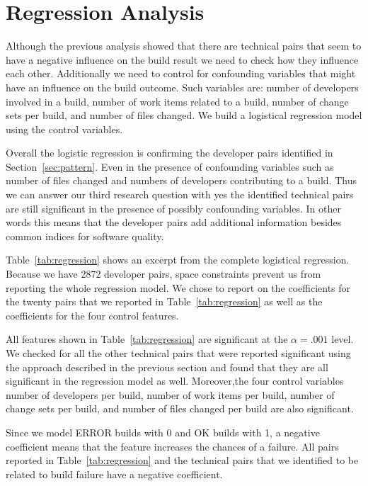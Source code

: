 

\section{Regression Analysis}
\label{sec:regression}
Although the previous analysis showed that there are technical pairs that seem to have a negative influence on the build result we need to check how they influence each other.
Additionally we need to control for confounding variables that might have an influence on the build outcome.
Such variables are: number of developers involved in a build, number of work items related to a build, number of change sets per build, and number of files changed.
We build a logistical regression model using the control variables.

Overall the logistic regression is confirming the developer pairs identified in Section~\ref{sec:pattern}.
Even in the presence of confounding variables such as number of files changed and numbers of developers contributing to a build.
Thus we can answer our third research question with yes the identified technical pairs are still significant in the presence of possibly confounding variables.
In other words this means that the developer pairs add additional information besides common indices for software quality.

Table~\ref{tab:regression} shows an excerpt from the complete logistical regression.
Because we have 2872 developer pairs, space constraints prevent us from reporting the whole regression model.
We chose to report on the coefficients for the twenty pairs that we reported in Table~\ref{tab:regression} as well as the coefficients for the four control features.

All features shown in Table~\ref{tab:regression} are significant at the $\alpha=.001$ level.
We checked for all the other technical pairs that were reported significant using the approach described in the previous section and found that they are all significant in the regression model as well.
Moreover,the four control variables number of developers per build, number of work items per build, number of change sets per build, and number of files changed per build are also significant.

Since we model ERROR builds with 0 and OK builds with 1, a negative coefficient means that the feature increases the chances of a failure.
All pairs reported in Table~\ref{tab:regression} and the technical pairs that we identified to be related to build failure have a negative coefficient.
 
